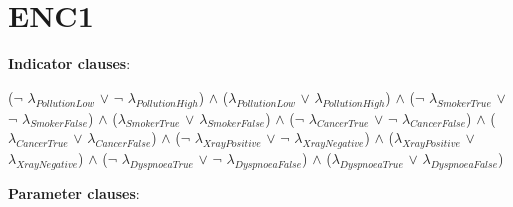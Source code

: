 \documentclass[a4paper,10pt]{report}
\begin{document}
\section{ENC1}
\label{ENC1}
\textbf{Indicator clauses}: 
\begin{center}
($\neg$ $\lambda_{PollutionLow}$ $\lor$ $\neg$ $\lambda_{PollutionHigh}$) $\land$ 
($\lambda_{PollutionLow}$ $\lor$ $\lambda_{PollutionHigh}$) $\land$ 
($\neg$ $\lambda_{SmokerTrue}$ $\lor$ $\neg$ $\lambda_{SmokerFalse}$) $\land$ 
($\lambda_{SmokerTrue}$ $\lor$ $\lambda_{SmokerFalse}$) $\land$ 
($\neg$ $\lambda_{CancerTrue}$ $\lor$ $\neg$ $\lambda_{CancerFalse}$) $\land$ 
($\lambda_{CancerTrue}$ $\lor$ $\lambda_{CancerFalse}$) $\land$ 
($\neg$ $\lambda_{XrayPositive}$ $\lor$ $\neg$ $\lambda_{XrayNegative}$) $\land$ 
($\lambda_{XrayPositive}$ $\lor$ $\lambda_{XrayNegative}$) $\land$ 
($\neg$ $\lambda_{DyspnoeaTrue}$ $\lor$ $\neg$ $\lambda_{DyspnoeaFalse}$) $\land$ 
($\lambda_{DyspnoeaTrue}$ $\lor$ $\lambda_{DyspnoeaFalse}$)
\end{center}
\textbf{Parameter clauses}: 
\end{document}
